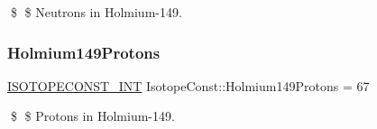 \$ \$ Neutrons in Holmium-\/149. \mbox{\label{group___isotope_const-_holmium-_ho149_ga6fd4362248d87ebbd7fb361d858899bd}} 
\subsubsection{\texorpdfstring{Holmium149\+Protons}{Holmium149Protons}}
{\footnotesize\ttfamily \mbox{\hyperlink{group___isotope_const-_macros_ga5f18360b3e99483a35c32d789e62621c}{I\+S\+O\+T\+O\+P\+E\+C\+O\+N\+S\+T\+\_\+\+I\+NT}} Isotope\+Const\+::\+Holmium149\+Protons = 67}

\$ \$ Protons in Holmium-\/149. 